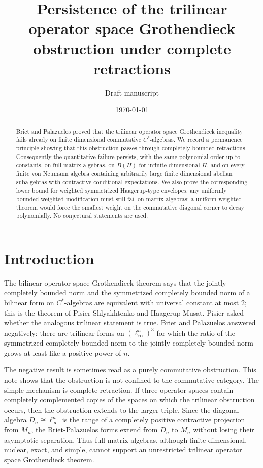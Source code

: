 \documentclass[11pt]{amsart}
\title[Persistence of the trilinear obstruction]
{Persistence of the trilinear operator space Grothendieck obstruction under complete retractions}
\author{Draft manuscript}
\date{\today}
\theoremstyle{definition}
\begin{document}
\begin{abstract}
Briet and Palazuelos proved that the trilinear operator space
Grothendieck inequality fails already on finite dimensional commutative
$C^*$-algebras. We record a permanence principle showing that this obstruction
passes through completely bounded retractions. Consequently the quantitative
failure persists, with the same polynomial order up to constants, on full
matrix algebras, on $B(H)$ for infinite dimensional $H$, and on every finite
von Neumann algebra containing arbitrarily large finite dimensional abelian
subalgebras with contractive conditional expectations. We also prove the
corresponding lower bound for weighted symmetrized Haagerup-type envelopes:
any uniformly bounded weighted modification must still fail on matrix
algebras; a uniform weighted theorem would force the smallest weight on the
commutative diagonal corner to decay polynomially. No conjectural statements
are used.
\end{abstract}

\maketitle

\section{Introduction}

The bilinear operator space Grothendieck theorem says that the jointly
completely bounded norm and the symmetrized completely bounded norm of a
bilinear form on $C^*$-algebras are equivalent with universal constant at most
$2$; this is the theorem of Pisier-Shlyakhtenko and Haagerup-Musat. Pisier
asked whether the analogous trilinear statement is true. Briet and Palazuelos
answered negatively: there are trilinear forms on $(\ell_\infty^n)^3$ for
which the ratio of the symmetrized completely bounded norm to the jointly
completely bounded norm grows at least like a positive power of $n$.

The negative result is sometimes read as a purely commutative obstruction.
This note shows that the obstruction is not confined to the commutative
category. The simple mechanism is complete retraction. If three operator
spaces contain completely complemented copies of the spaces on which the
trilinear obstruction occurs, then the obstruction extends to the larger
triple. Since the diagonal algebra $D_n\cong \ell_\infty^n$ is the range of a
completely positive contractive projection from $M_n$, the Briet-Palazuelos
forms extend from $D_n$ to $M_n$ without losing their asymptotic separation.
Thus full matrix algebras, although finite dimensional, nuclear, exact, and
simple, cannot support an unrestricted trilinear operator space
Grothendieck theorem.
\end{document}
